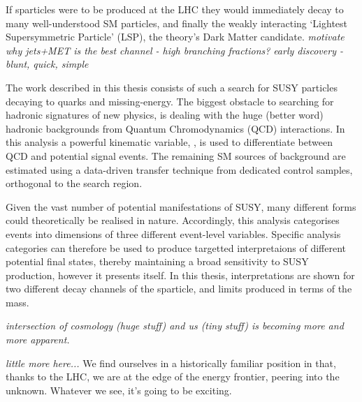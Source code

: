 If sparticles were to be produced at the LHC they would immediately decay to
many well-understood SM particles, and finally the weakly interacting `Lightest
Supersymmetric Particle' (LSP), the theory's Dark Matter candidate.
\emph{motivate why jets+MET is the best channel - high branching fractions?}
\emph{early discovery - blunt, quick, simple}

The work described in this thesis consists of such a search for SUSY particles
decaying to quarks and missing-energy. The biggest obstacle to
searching for hadronic signatures of new physics, is dealing with the huge
(better word) hadronic backgrounds from Quantum Chromodynamics (QCD)
interactions. In this
analysis a powerful kinematic variable, \alphat, is used to differentiate
between QCD and potential signal events. The remaining SM sources of background
are estimated using a data-driven transfer technique from dedicated control
samples, orthogonal to the search region.

Given the vast number of potential manifestations of SUSY, many different forms
could theoretically be realised in nature. Accordingly, this analysis
categorises events into dimensions of three different event-level variables.
Specific analysis categories can therefore be used to produce targetted
interpretaions of different potential final states, thereby maintaining a broad
sensitivity to SUSY production, however it presents itself. In this thesis,
interpretations are shown for two different decay channels of the \sTop
sparticle, and limits produced in terms of the \sTop mass.


\emph{intersection of cosmology (huge stuff) and us (tiny stuff) is becoming more
and
more apparent.}

\emph{little more here...}
We find ourselves in a historically familiar position in that, thanks to the
LHC, we are at the edge of the energy frontier, peering into the unknown.
Whatever we see, it's going to be exciting.
